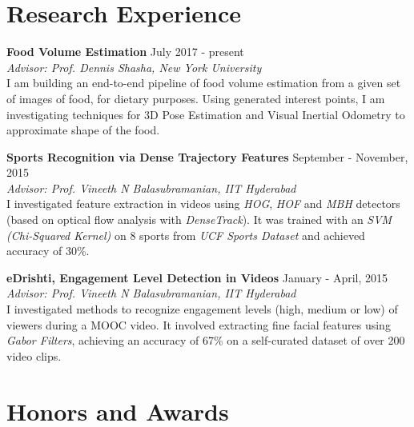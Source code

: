 \documentclass[margin,line]{res}
\begin{document}
\begin{resume}
\begin{comment}
  \vspace*{-3.5mm}

  {\bf La Montessori School}, Kullu, HP, India \hfill 2010 \\
	Matriculation,
    GPA: 9.8 / 10, ({\bf Top 2})

  \vspace*{-3.5mm}
  \end{comment}

\section{\sc Research Experience}
  {\bf Food Volume Estimation} \hfill July 2017 - present \\
    {\em Advisor: Prof. Dennis Shasha, New York University} \\
    I am building an end-to-end pipeline of food volume estimation from a given set of images of food, for dietary purposes. Using generated interest points, I am investigating techniques for 3D Pose Estimation and Visual Inertial Odometry to approximate shape of the food.

    \vspace*{-3.5mm}

  {\bf Sports Recognition via Dense Trajectory Features} \hfill September - November, 2015 \\
  	{\em Advisor: Prof. Vineeth N Balasubramanian, IIT Hyderabad} \\
    I investigated feature extraction in videos using {\it HOG}, {\it HOF} and {\it MBH} detectors (based on optical flow analysis with {\it DenseTrack}). It was trained with an {\it SVM (Chi-Squared Kernel)} on 8 sports from {\it UCF Sports Dataset} and achieved accuracy of 30\%.

  \vspace*{-3.5mm}

  {\bf eDrishti, Engagement Level Detection in Videos} \hfill January - April, 2015 \\
  	{\em Advisor: Prof. Vineeth N Balasubramanian, IIT Hyderabad} \\
  	I investigated methods to recognize engagement levels (high, medium or low) of viewers during a MOOC video. It involved extracting fine facial features using {\it Gabor Filters}, achieving an accuracy of 67\% on a self-curated dataset of over 200 video clips.

  \vspace*{-3.5mm}

\section{\sc Honors and Awards}


\end{resume}
\end{document}
